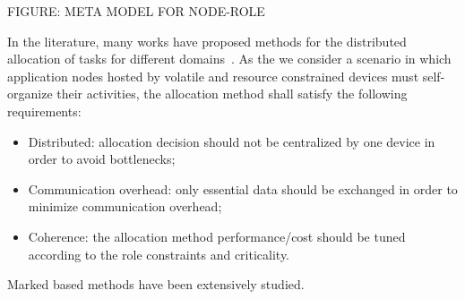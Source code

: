 FIGURE: META MODEL FOR NODE-ROLE

In the literature, many works have proposed methods for the distributed allocation of tasks for different domains~\cite{}. As the we consider a scenario in which application nodes hosted by volatile and resource constrained devices must self-organize their activities, the allocation method shall satisfy the following requirements:

\begin{itemize}
	
	\item Distributed: allocation decision should not be centralized by one device in order to avoid bottlenecks;
	
	\item Communication overhead: only essential data should be exchanged in order to minimize communication overhead; 
	
	\item Coherence: the allocation method performance/cost should be tuned according to the role constraints and criticality.
	  
\end{itemize} 

Marked based methods have been extensively studied.





